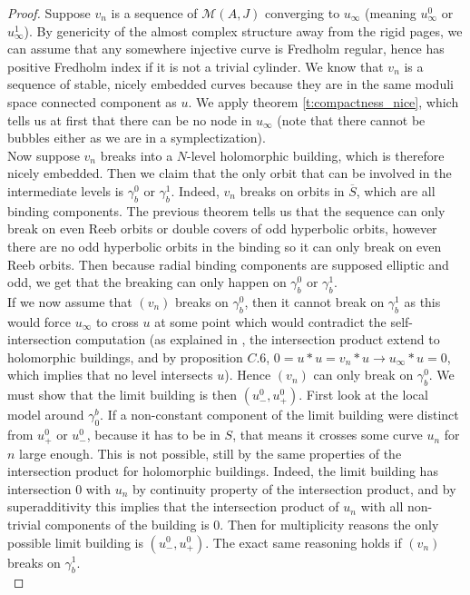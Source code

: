\documentclass[../main.tex]{subfiles}
\begin{document}
\begin{proof}
Suppose $v_n$ is a sequence of $\mathcal{M}(A,J)$ converging to $u_\infty$ (meaning $u_\infty^0$ or $u_\infty^1$). By genericity of the almost complex structure away from the rigid pages, we can assume that any somewhere injective curve is Fredholm regular, hence has positive Fredholm index if it is not a trivial cylinder. We know that $v_n$ is a sequence of stable, nicely embedded curves because they are in the same moduli space connected component as $u$. We apply theorem \ref{t:compactness_nice}, which tells us at first that there can be no node in $u_\infty$ (note that there cannot be bubbles either as we are in a symplectization). \\

Now suppose $v_n$ breaks into a $N$-level holomorphic building, which is therefore nicely embedded. Then we claim that the only orbit that can be involved in the intermediate levels is $\gamma_b^0$ or $\gamma_b^1$. Indeed, $v_n$ breaks on orbits in $\overline{S}$, which are all binding components. The previous theorem tells us that the sequence can only break on even Reeb orbits or double covers of odd hyperbolic orbits, however there are no odd hyperbolic orbits in the binding so it can only break on even Reeb orbits. Then because radial binding components are supposed elliptic and odd, we get that the breaking can only happen on $\gamma_b^0$ or $\gamma_b^1$. \\

If we now assume that $(v_n)$ breaks on $\gamma_b^0$, then it cannot break on $\gamma_b^1$ as this would force $u_\infty$ to cross $u$ at some point which would contradict the self-intersection computation (as explained in \cite{wendl_contact_2019}, the intersection product extend to holomorphic buildings, and by proposition $C.6$, $0 = u*u = v_n*u\rightarrow u_\infty*u= 0$, which implies that no level intersects $u$). Hence $(v_n)$ can only break on $\gamma_b^0$. We must show that the limit building is then $(u_-^0,u_+^0)$. First look at the local model around $\gamma_0^b$. If a non-constant component of the limit building were distinct from $u^0_+$ or $u_-^0$, because it has to be in $S$, that means it crosses some curve $u_n$ for $n$ large enough. This is not possible, still by the same properties of the intersection product for holomorphic buildings. Indeed, the limit building has intersection $0$ with $u_n$ by continuity property of the intersection product, and by superadditivity this implies that the intersection product of $u_n$ with all non-trivial components of the building is $0$. Then for multiplicity reasons the only possible limit building is $(u_-^0,u_+^0)$. The exact same reasoning holds if $(v_n)$ breaks on $\gamma_b^1$. \\


\end{proof}
\end{document}
